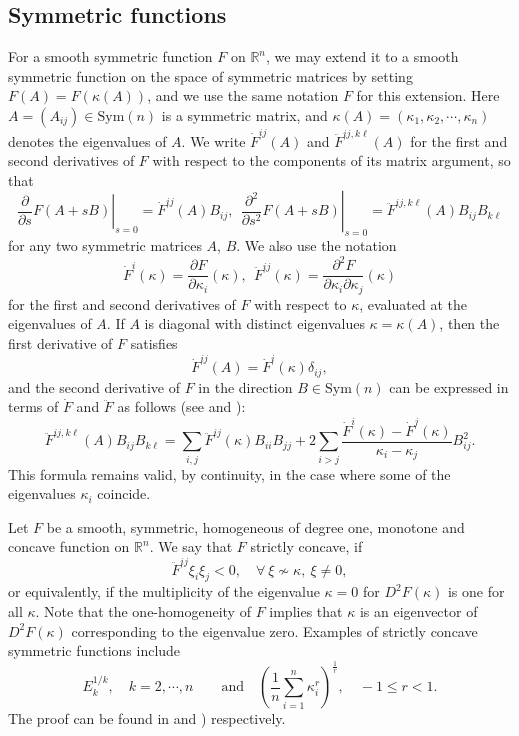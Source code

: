 \documentclass[11pt,reqno]{amsart}
\theoremstyle{remark}
\numberwithin{equation}{section}
\begin{document}
\subsection{Symmetric functions}\label{sec.2-1}
For a smooth symmetric function $F$ on $\mathbb{R}^n$, we may extend it to a smooth symmetric function on the space of symmetric matrices by setting $F(A)=F(\kappa(A))$, and we use the same notation $F$ for this extension. Here $A=(A_{ij})\in\mathrm{Sym}(n)$ is a symmetric matrix, and $\kappa(A)=(\kappa_1,\kappa_2,\cdots,\kappa_n)$ denotes the eigenvalues of $A$. We write $\dot{F}^{ij}(A)$ and $\ddot{F}^{ij,k\ell}(A)$ for the first and second derivatives of $F$ with respect to the components of its matrix argument, so that
\begin{equation*}
	\left.\dfrac{\partial}{\partial s}F(A+sB)\right|_{s=0} = \dot{F}^{ij}(A)B_{ij},\ \ \left.\dfrac{\partial^2}{\partial s^2}F(A+sB)\right|_{s=0} = \ddot{F}^{ij,k\ell}(A)B_{ij}B_{k\ell}
\end{equation*}
for any two symmetric matrices $A$, $B$. We also use the notation
\begin{equation*}
	\dot{F}^i(\kappa) = \dfrac{\partial F}{\partial \kappa_i}(\kappa),\ \ \ddot{F}^{ij}(\kappa) = \dfrac{\partial^2 F}{\partial \kappa_i \partial \kappa_j}(\kappa)
\end{equation*}
for the first and second derivatives of $F$ with respect to $\kappa$, evaluated at the eigenvalues of $A$. If $A$ is diagonal with distinct eigenvalues $\kappa=\kappa(A)$, then the first derivative of $F$ satisfies
\begin{equation*}
	\dot{F}^{ij}(A) = \dot{F}^i(\kappa)\delta_{ij},
\end{equation*}
and the second derivative of $F$ in the direction $B\in\mathrm{Sym}(n)$ can be expressed in terms of $\dot{F}$ and $\ddot{F}$ as follows (see \cite[Theorem 5.1]{And07} and \cite[Lemma 1.1]{ge96}):
\begin{equation}
	\ddot{F}^{ij,k\ell}(A)B_{ij}B_{k\ell} = \sum\limits_{i,j}\ddot{F}^{ij}(\kappa)B_{ii}B_{jj} + 2 \sum\limits_{i>j} \dfrac{\dot{F}^i(\kappa)-\dot{F}^j(\kappa)}{\kappa_i-\kappa_j}B_{ij}^2.
	\label{equ-secf}
\end{equation}
This formula remains valid, by continuity, in the case where some of the eigenvalues $\kappa_i$ coincide.

Let $F$ be a smooth, symmetric, homogeneous of degree one, monotone and concave function on $\mathbb{R}^n$. We say that $F$ strictly concave, if 
\[\ddot{F}^{ij}\xi_i\xi_j<0,\quad \forall~\xi\nsim \kappa,~\xi\neq 0,\]
or equivalently, if the multiplicity of the eigenvalue $\kappa=0$ for $D^2F(\kappa)$ is one for all $\kappa$. Note that the one-homogeneity of $F$ implies that $\kappa$ is an eigenvector of $D^2F(\kappa)$ corresponding to the eigenvalue zero. Examples of strictly concave symmetric functions include 
\[E_k^{1/k},\quad k=2,\cdots,n\qquad \text{and}\quad \left(\frac{1}{n}\sum_{i=1}^{n}\kappa_i^r\right)^{\frac{1}{r}},\quad -1\leq r<1.\]
The proof can be found in \cite[Theorem 3.2]{Ger15} and \cite[Lemma 3.2]{Yu16}) respectively. 
\end{document}
